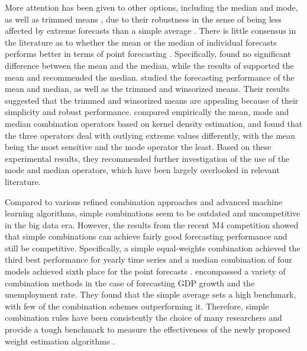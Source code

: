 \documentclass[11pt]{article}
\begin{document}
More attention has been given to other options, including the median and mode, as well as trimmed means \citep[e.g.,][]{Chan1999-io,Stock2004-rq,Genre2013-ut,Jose2014-uh,Grushka-Cockayne2017-dj}, due to their robustness in the sense of being less affected by extreme forecasts than a simple average \citep{Lichtendahl2020-ut}. There is little consensus in the literature as to whether the mean or the median of individual forecasts performs better in terms of point forecasting \citep{Kolassa2011-ai}. Specifically, \cite{McNees1992-qc} found no significant difference between the mean and the median, while the results of \cite{Stock2004-rq} supported the mean and \cite{Agnew1985-dj} recommended the median. \cite{Jose2008-vm} studied the forecasting performance of the mean and median, as well as the trimmed and winsorized means. Their results suggested that the trimmed and winsorized means are appealing because of their simplicity and robust performance. \cite{Kourentzes2014-hs} compared empirically the mean, mode and median combination operators based on kernel density estimation, and found that the three operators deal with outlying extreme values differently, with the mean being the most sensitive and the mode operator the least. Based on these experimental results, they recommended further investigation of the use of the mode and median operators, which have been largely overlooked in relevant literature.

Compared to various refined combination approaches and advanced machine learning algorithms, simple combinations seem to be outdated and uncompetitive in the big data era. However, the results from the recent M4 competition \citep{Makridakis2020-hu} showed that simple combinations can achieve fairly good forecasting performance and still be competitive. Specifically, a simple equal-weights combination achieved the third best performance for yearly time series \citep{Shaub2019-on} and a median combination of four models achieved sixth place for the point forecasts \citep{Petropoulos2020-fp}. \cite{Genre2013-ut} encompassed a variety of combination methods in the case of forecasting GDP growth and the unemployment rate. They found that the simple average sets a high benchmark, with few of the combination schemes outperforming it. Therefore, simple combination rules have been consistently the choice of many researchers and provide a tough benchmark to measure the effectiveness of the newly proposed weight estimation algorithms \citep[e.g.,][]{Makridakis2000-he,Stock2004-rq,Makridakis2020-hu,Montero-Manso2020-tq,Kang2020-rl,Wang2021-un}.
\end{document}
